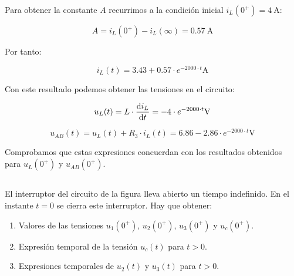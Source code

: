\documentclass[12pt]{article}
\begin{document}
Para obtener la constante $A$ recurrimos a la condición inicial
$i_L(0^+) = \qty{4}{\ampere}$:

\begin{equation*}
  A = i_L(0^+) - i_L(\infty) = \qty{0.57}{\ampere}
\end{equation*}

Por tanto:

\begin{equation*}
  i_L(t) = 3.43 + 0.57 \cdot e^{-2000 \cdot t} \unit{\ampere}
\end{equation*}

Con este resultado podemos obtener las tensiones en el circuito:

\begin{equation*}
  u_L(t) = L \cdot \diff{i_L}{t} = - 4 \cdot e^{-2000 \cdot t} \unit{\volt}
\end{equation*}


\begin{equation*}
  u_{AB}(t) =  u_L(t) + R_3 \cdot i_L(t) = 6.86 - 2.86 \cdot e^{-2000 \cdot t} \unit{\volt}
\end{equation*}

Comprobamos que estas expresiones concuerdan con los resultados
obtenidos para $u_L(0^+)$ y $u_{AB}(0^+)$.

\clearpage

\subsection{}

El interruptor del circuito de la figura lleva abierto un tiempo
indefinido. En el instante $t= 0$ se cierra este interruptor. Hay que
obtener:
\begin{enumerate}
\item Valores de las tensiones $u_1(0^+)$, $u_2(0^+)$, $u_3(0^+)$ y
  $u_c(0^+)$.
\item Expresión temporal de la tensión $u_c(t)$ para $t > 0$.
\item Expresiones temporales de $u_2(t)$ y $u_3(t)$ para $t > 0$.
\end{enumerate}
\end{document}
